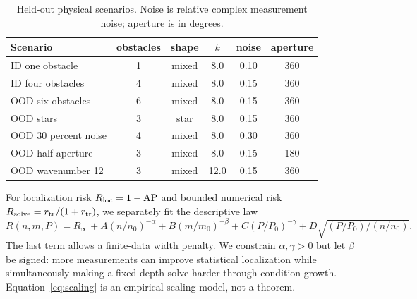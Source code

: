 \documentclass[10pt]{article}
\begin{document}
\begin{table}[t]
\centering\scriptsize
\caption{Held-out physical scenarios.  Noise is relative complex measurement
noise; aperture is in degrees.}
\begin{tabular}{lccccc}
\toprule Scenario & obstacles & shape & $k$ & noise & aperture\\
\midrule
ID one obstacle & 1 & mixed & 8.0 & 0.10 & 360 \\
ID four obstacles & 4 & mixed & 8.0 & 0.15 & 360 \\
OOD six obstacles & 6 & mixed & 8.0 & 0.15 & 360 \\
OOD stars & 3 & star & 8.0 & 0.15 & 360 \\
OOD 30 percent noise & 4 & mixed & 8.0 & 0.30 & 360 \\
OOD half aperture & 3 & mixed & 8.0 & 0.15 & 180 \\
OOD wavenumber 12 & 3 & mixed & 12.0 & 0.15 & 360 \\
\bottomrule
\end{tabular}
\end{table}

For localization risk $R_{\rm loc}=1-\mathrm{AP}$ and bounded numerical
risk $R_{\rm solve}=r_{\rm tr}/(1+r_{\rm tr})$, we separately fit the
descriptive law
\begin{equation}
 R(n,m,P)=R_\infty+A(n/n_0)^{-\alpha}+B(m/m_0)^{-\beta}
 +C(P/P_0)^{-\gamma}+D\sqrt{(P/P_0)/(n/n_0)}.
 \label{eq:scaling}
\end{equation}
The last term allows a finite-data width penalty.  We constrain
$\alpha,\gamma>0$ but let $\beta$ be signed: more measurements can improve
statistical localization while simultaneously making a fixed-depth solve
harder through condition growth.  Equation~\eqref{eq:scaling} is an
empirical scaling model, not a theorem.
\end{document}

